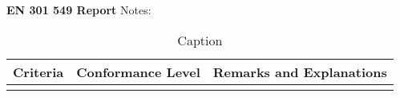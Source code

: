 \textbf{EN 301 549 Report}
Notes: 
\begin{table}[]
    \centering
    \begin{tabular}{c|c|c}
        Criteria & Conformance Level & Remarks and Explanations\\
        \hline
         & 
    \end{tabular}
    \caption{Caption}
    \label{tab:my_label}
\end{table}